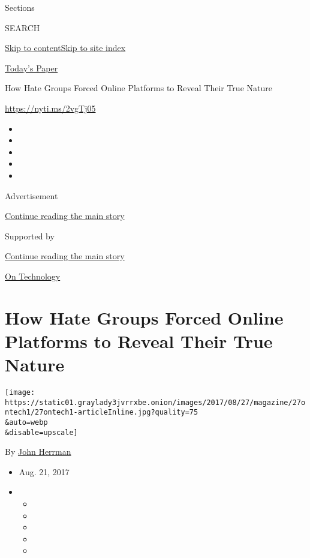 Sections

SEARCH

\protect\hyperlink{site-content}{Skip to
content}\protect\hyperlink{site-index}{Skip to site index}

\href{https://myaccount.nytimes3xbfgragh.onion/auth/login?response_type=cookie\&client_id=vi}{}

\href{https://www.nytimes3xbfgragh.onion/section/todayspaper}{Today's
Paper}

How Hate Groups Forced Online Platforms to Reveal Their True Nature

\url{https://nyti.ms/2vgTj05}

\begin{itemize}
\item
\item
\item
\item
\item
\end{itemize}

Advertisement

\protect\hyperlink{after-top}{Continue reading the main story}

Supported by

\protect\hyperlink{after-sponsor}{Continue reading the main story}

\href{/column/on-technology}{On Technology}

\hypertarget{how-hate-groups-forced-online-platforms-to-reveal-their-true-nature}{%
\section{How Hate Groups Forced Online Platforms to Reveal Their True
Nature}\label{how-hate-groups-forced-online-platforms-to-reveal-their-true-nature}}

\texttt{[image: https://static01.graylady3jvrrxbe.onion/images/2017/08/27/magazine/27ontech1/27ontech1-articleInline.jpg?quality=75\\\&auto=webp\\\&disable=upscale]}

By \href{https://www.nytimes3xbfgragh.onion/by/john-herrman}{John
Herrman}

\begin{itemize}
\item
  Aug. 21, 2017
\item
  \begin{itemize}
  \item
  \item
  \item
  \item
  \item
  \end{itemize}
\end{itemize}

